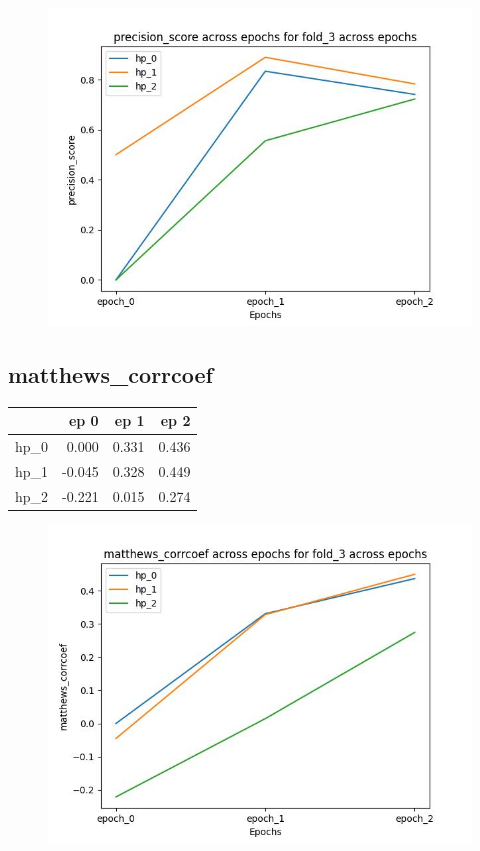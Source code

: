 \documentclass{article}
\begin{document}
\begin{figure}[H]
\includegraphics[scale = 0.75]{fold_3/precision_score}
\end{figure}
\subsection{matthews\_corrcoef}
\begin{tabular}{lrrr}
\toprule
{} &   ep 0 &   ep 1 &   ep 2 \\
\midrule
hp\_0 &  0.000 &  0.331 &  0.436 \\
hp\_1 & -0.045 &  0.328 &  0.449 \\
hp\_2 & -0.221 &  0.015 &  0.274 \\
\bottomrule
\end{tabular}

\begin{figure}[H]
\includegraphics[scale = 0.75]{fold_3/matthews_corrcoef}
\end{figure}
\end{document}
